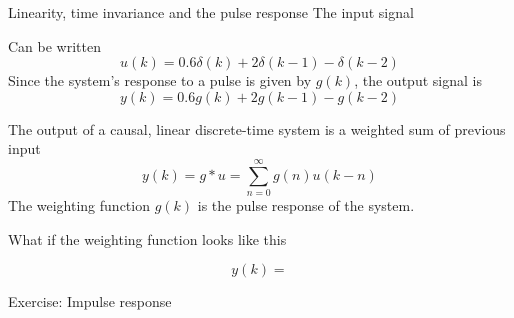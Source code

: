 \documentclass[presentation,aspectratio=1610]{beamer}
\begin{document}
\begin{frame}[label=sec-1-3]{Linearity, time invariance and the pulse response}
The input signal

\begin{center}
\end{center}

\vspace*{-5mm}


Can be written 
\[u(k) = 0.6\delta(k) + 2\delta(k-1) - \delta(k-2) \]
Since the system's response to a pulse is given by $g(k)$, the output signal is
\[ y(k) = 0.6g(k) + 2g(k-1) - g(k-2) \]
\end{frame}


\begin{frame}[label=sec-1-4]{The output of a causal, linear discrete-time system is a weighted sum of previous input}
\[ y(k) = g \ast u = \sum_{n=0}^\infty g(n) u(k-n) \]
The \alert{weighting function} $g(k)$ is the \alert{pulse response} of the system.

What if the weighting function looks like this

\begin{center}
\end{center}

\[y(k) = \]
\end{frame}

\begin{frame}[label=sec-1-5]{Exercise: Impulse response}
\end{frame}
\end{document}
